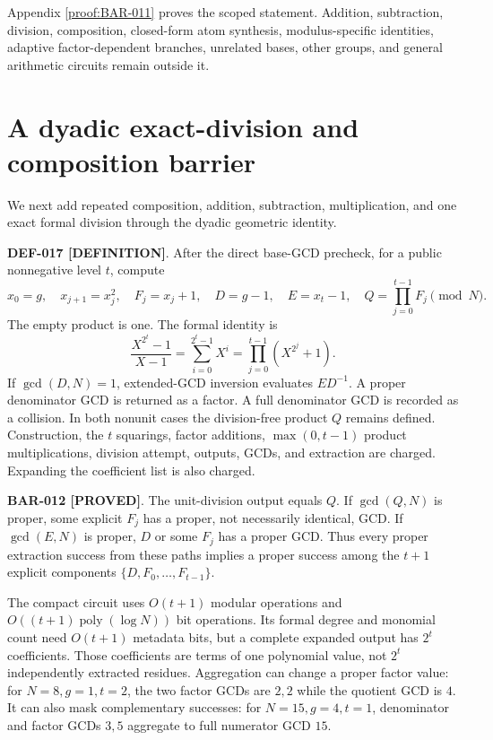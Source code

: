 \documentclass[11pt]{article}
\newcommand{\claimstatus}[2]{\textbf{#1 [#2]}}
\newcommand{\poly}{\operatorname{poly}}
\begin{document}
Appendix \ref{proof:BAR-011} proves the scoped statement. Addition,
subtraction, division, composition, closed-form atom synthesis,
modulus-specific identities, adaptive factor-dependent branches, unrelated
bases, other groups, and general arithmetic circuits remain outside it.

\section{A dyadic exact-division and composition barrier}

We next add repeated composition, addition, subtraction, multiplication, and
one exact formal division through the dyadic geometric identity.

\claimstatus{DEF-017}{DEFINITION}. After the direct base-GCD precheck, for a
public nonnegative level \(t\), compute
\[
x_0=g,\quad x_{j+1}=x_j^2,\quad F_j=x_j+1,\quad
D=g-1,\quad E=x_t-1,\quad Q=\prod_{j=0}^{t-1}F_j
\pmod N.
\]
The empty product is one. The formal identity is
\[
\frac{X^{2^t}-1}{X-1}
=\sum_{i=0}^{2^t-1}X^i
=\prod_{j=0}^{t-1}(X^{2^j}+1).
\]
If \(\gcd(D,N)=1\), extended-GCD inversion evaluates \(ED^{-1}\).
A proper denominator GCD is returned as a factor. A full denominator GCD is
recorded as a collision. In both nonunit cases the division-free product
\(Q\) remains defined. Construction, the \(t\) squarings, factor additions,
\(\max(0,t-1)\) product multiplications, division attempt, outputs, GCDs, and
extraction are charged. Expanding the coefficient list is also charged.

\claimstatus{BAR-012}{PROVED}. The unit-division output equals \(Q\). If
\(\gcd(Q,N)\) is proper, some explicit \(F_j\) has a proper, not necessarily
identical, GCD. If \(\gcd(E,N)\) is proper, \(D\) or some \(F_j\) has a proper
GCD. Thus every proper extraction success from these paths implies a proper
success among the \(t+1\) explicit components
\(\{D,F_0,\ldots,F_{t-1}\}\).

The compact circuit uses \(O(t+1)\) modular operations and
\(O((t+1)\poly(\log N))\) bit operations. Its formal degree and monomial
count need \(O(t+1)\) metadata bits, but a complete expanded output has
\(2^t\) coefficients. Those coefficients are terms of one polynomial value,
not \(2^t\) independently extracted residues. Aggregation can change a
proper factor value: for \(N=8,g=1,t=2\), the two factor GCDs are \(2,2\)
while the quotient GCD is \(4\). It can also mask complementary successes:
for \(N=15,g=4,t=1\), denominator and factor GCDs \(3,5\) aggregate to full
numerator GCD \(15\).
\end{document}
